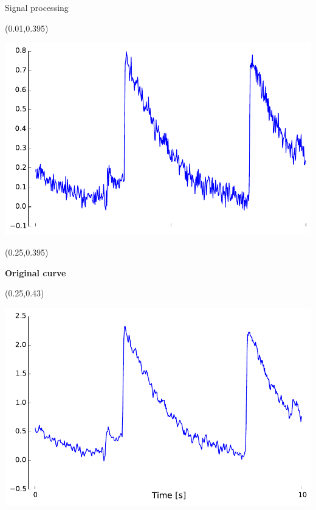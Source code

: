 \documentclass[final]{beamer}
\newenvironment{shaded2}{%
  \def\FrameCommand{\fboxsep=\FrameSep \colorbox{blue!20}}%
  \MakeFramed {\FrameRestore}}%
 {\endMakeFramed}
\begin{document}
\begin{frame}{}
\begin{textblock}{0.485}
\begin{block}{Signal processing \phantom{p}}
\begin{textblock}{0.485}(0.01,0.395)
\begin{minipage}{0.48\linewidth}
\begin{shaded}
\begin{center}
\includegraphics[width=0.85\linewidth]{images/original_curve.pdf}
\end{center}
\end{shaded}
\end{minipage}
\end{textblock}

\begin{textblock}{0.485}(0.25,0.395)
\begin{minipage}{0.48\linewidth}
\begin{shaded}
\vspace{15pt}
\hspace{1cm} {\small \textbf{Original curve}}
\vspace{30pt}
\end{shaded}
\end{minipage}
\end{textblock}

\begin{textblock}{0.485}(0.25,0.43)
\begin{minipage}{0.48\linewidth}
\begin{shaded2}
\begin{center}

\includegraphics[width=0.85\linewidth]{images/filter_curve.pdf}
\end{center}
\vspace{15pt}
\end{shaded2}
\end{minipage}
\end{textblock}


\end{block}
\end{textblock}
\end{frame}
\end{document}
